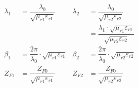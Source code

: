 
\begin{align*}
    \quad \qquad \lambda_1 & = \dfrac{\lambda_0}{\sqrt{\mu_{r1}\varepsilon_{r1}}}          & \lambda_2 & = \dfrac{\lambda_0}{\sqrt{\mu_{r2}\varepsilon_{r2}}}                                     \\
    \quad \qquad           &                                                               &           & = \dfrac{\lambda_1\cdot\sqrt{\mu_{r1}\varepsilon_{r1}}}{\sqrt{\mu_{r2}\varepsilon_{r2}}} \\
    \quad \qquad \beta_1   & = \dfrac{2\pi}{\lambda_0}\cdot\sqrt{\mu_{r1}\varepsilon_{r1}} & \beta_2   & = \dfrac{2\pi}{\lambda_0}\cdot\sqrt{\mu_{r2}\varepsilon_{r2}}                            \\
    \quad \qquad Z_{F1}    & = \dfrac{Z_{F0}}{\sqrt{\mu_{r1}\varepsilon_{r1}}}             & Z_{F2}    & = \dfrac{Z_{F0}}{\sqrt{\mu_{r2}\varepsilon_{r2}}}
\end{align*}

%


